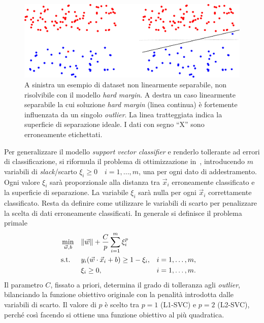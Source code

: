 \begin{figure}
    \centering
    \includegraphics[width=\linewidth]{img/casi_dove_hardmargin_va_male_o_non_va.pdf}
    \caption{A sinistra un esempio di dataset non linearmente separabile, non risolvibile con il modello \emph{hard margin}. A destra un caso linearmente separabile la cui soluzione \emph{hard margin} (linea continua) è fortemente influenzata da un singolo \emph{outlier}. La linea tratteggiata indica la superficie di separazione ideale.
    I dati con segno ``X'' sono erroneamente etichettati.}
    \label{fig:svc:softmargin:casi_che_hardmargin_non_risolve}
\end{figure}
Per generalizzare il modello \emph{support vector classifier} e renderlo tollerante ad errori di classificazione, si riformula il problema di ottimizzazione in~, introducendo $m$ variabili di \emph{slack}/scarto $\xi_i \geq 0 \quad i=1,...,m$, una per ogni dato di addestramento. 
Ogni valore $\xi_i$ sarà proporzionale alla distanza tra $\Vec{x}_i$ erroneamente classificato e la superficie di separazione. 
La variabile $\xi_i$ sarà nulla per ogni $\Vec{x}_i$ correttamente classificato. Resta da definire come utilizzare le variabili di scarto per penalizzare la scelta di dati erroneamente classificati. 
In generale si definisce il problema primale
\begin{equation}
\begin{aligned}
& \min_{\Vec{w},b}    && \|\Vec{w}\| + \frac{C}{p}\sum_{i=1}^{m}\xi_i^p\\
& \textrm{s.t.} && y_i(\Vec{w}\cdot\Vec{x}_i + b) \geq 1 - \xi_i, &&  i=1,\dots,m, \\
&               && \xi_i \geq 0,                 &&  i=1,\dots,m.\\
\end{aligned}
\end{equation}
Il parametro $C$, fissato a priori, determina il grado di tolleranza agli \emph{outlier}, bilanciando la funzione obiettivo originale con la penalità introdotta dalle variabili di scarto.
%
Il valore di $p$ è scelto tra $p=1$ (L1-SVC) e $p=2$ (L2-SVC), perché così facendo si ottiene una funzione obiettivo al più quadratica. 
